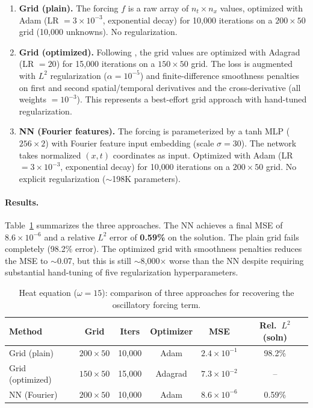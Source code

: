 \documentclass[11pt]{article}
\begin{document}
\begin{enumerate}
  \item \textbf{Grid (plain).} The forcing $f$ is a raw array of $n_t \times n_x$ values, optimized with Adam (LR $= 3 \times 10^{-3}$, exponential decay) for 10{,}000 iterations on a $200 \times 50$ grid (10{,}000 unknowns). No regularization.

  \item \textbf{Grid (optimized).} Following \citet{khimin2024optimal}, the grid values are optimized with Adagrad (LR $= 20$) for 15{,}000 iterations on a $150 \times 50$ grid. The loss is augmented with $L^2$ regularization ($\alpha = 10^{-5}$) and finite-difference smoothness penalties on first and second spatial/temporal derivatives and the cross-derivative (all weights $= 10^{-3}$). This represents a best-effort grid approach with hand-tuned regularization.

  \item \textbf{NN (Fourier features).} The forcing is parameterized by a tanh MLP ($256 \times 2$) with Fourier feature input embedding (scale $\sigma = 30$). The network takes normalized $(x, t)$ coordinates as input. Optimized with Adam (LR $= 3 \times 10^{-3}$, exponential decay) for 10{,}000 iterations on a $200 \times 50$ grid. No explicit regularization ($\sim$198K parameters).
\end{enumerate}

\paragraph{Results.} Table~\ref{tab:heat_results} summarizes the three approaches. The NN achieves a final MSE of $8.6 \times 10^{-6}$ and a relative $L^2$ error of \textbf{0.59\%} on the solution. The plain grid fails completely (98.2\% error). The optimized grid with smoothness penalties reduces the MSE to $\sim$0.07, but this is still $\sim$8{,}000$\times$ worse than the NN despite requiring substantial hand-tuning of five regularization hyperparameters.

\begin{table}[htbp]
  \centering
  \caption{Heat equation ($\omega = 15$): comparison of three approaches for recovering the oscillatory forcing term.}
  \label{tab:heat_results}
  \begin{tabular}{lccccc}
    \toprule
    \textbf{Method} & \textbf{Grid} & \textbf{Iters} & \textbf{Optimizer} & \textbf{MSE} & \textbf{Rel.\ $L^2$ (soln)} \\
    \midrule
    Grid (plain)     & $200 \times 50$ & 10{,}000 & Adam & $2.4 \times 10^{-1}$ & 98.2\% \\
    Grid (optimized) & $150 \times 50$ & 15{,}000 & Adagrad & $7.3 \times 10^{-2}$ & -- \\
    NN (Fourier)     & $200 \times 50$ & 10{,}000 & Adam & $8.6 \times 10^{-6}$ & 0.59\% \\
    \bottomrule
  \end{tabular}
\end{table}
\end{document}
